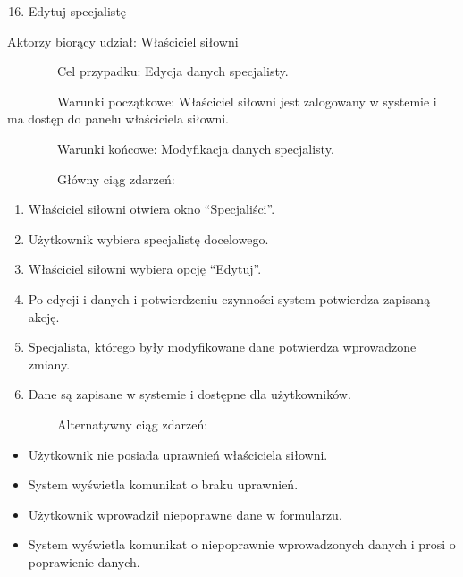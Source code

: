 \begin{enumerate}
\setcounter{enumi}{15}
\tightlist
\item
  {Edytuj specjalistę}
\end{enumerate}

{Aktorzy biorący udział: Właściciel siłowni}

{~~~~~~~~Cel przypadku: Edycja danych specjalisty.}

{~~~~~~~~Warunki początkowe: Właściciel siłowni jest zalogowany w
systemie i ma dostęp do panelu właściciela siłowni.}

{~~~~~~~~Warunki końcowe: Modyfikacja danych specjalisty.}

{~~~~~~~~Główny ciąg zdarzeń:}

\begin{enumerate}
\tightlist
\item
  {Właściciel siłowni otwiera okno ``Specjaliści''.}
\item
  {Użytkownik wybiera specjalistę docelowego.}
\item
  {Właściciel siłowni wybiera opcję ``Edytuj''.}
\item
  {Po edycji i danych i potwierdzeniu czynności system potwierdza
  zapisaną akcję.}
\item
  {Specjalista, którego były modyfikowane dane potwierdza wprowadzone
  zmiany.}
\item
  {Dane są zapisane w systemie i dostępne dla użytkowników.}
\end{enumerate}

{~~~~~~~~Alternatywny ciąg zdarzeń:}

\begin{itemize}
\tightlist
\item
  {Użytkownik nie posiada uprawnień właściciela siłowni.}
\end{itemize}

\begin{itemize}
\tightlist
\item
  {System wyświetla komunikat o braku uprawnień.}
\end{itemize}

\begin{itemize}
\tightlist
\item
  {Użytkownik wprowadził niepoprawne dane w formularzu.}
\end{itemize}

\begin{itemize}
\tightlist
\item
  {System wyświetla komunikat o niepoprawnie wprowadzonych danych i
  prosi o poprawienie danych.}
\end{itemize}

